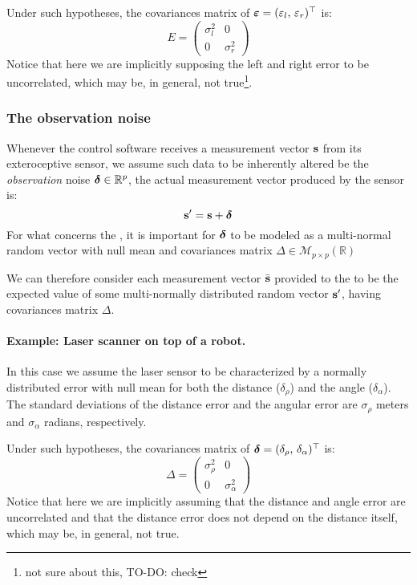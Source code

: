 			Under such hypotheses, the covariances matrix of $\boldsymbol{\mathrm{{\varepsilon}}} = (\varepsilon_l,\, \varepsilon_r)^\top$ is:
			\[
				E = 
				\left(\begin{array}{cc}
					\sigma^2_l & 0 \\
					0 & \sigma^2_r
				\end{array}\right)
			\]
			Notice that here we are implicitly supposing the left and right error to be uncorrelated, which may be, in general, not true\footnote{\label{sec.ekf.not_sure}not sure about this, TO-DO: check}.
			
	\subsubsection{The observation noise}
		Whenever the control software receives a measurement vector $\boldsymbol{\mathrm{{s}}}$ from its exteroceptive sensor, we assume such data to be inherently altered be the \emph{observation} noise $\boldsymbol{\mathrm{{\delta}}} \in \mathbb{R}^p$, \ie{} the actual measurement vector produced by the sensor is:
		\[
			\boldsymbol{\mathrm{{s}}}' = \boldsymbol{\mathrm{{s}}} + \boldsymbol{\mathrm{{\delta}}}
		\]
		For what concerns the \EKF{}, it is important for $\boldsymbol{\mathrm{{\delta}}}$ to be modeled as a multi-normal random vector with null mean and covariances matrix $\Delta \in \mathcal{M}_{p \times p}(\mathbb{R})$
		
		We can therefore consider each measurement vector $\bar{\boldsymbol{\mathrm{{s}}}}$ provided to the \EKF{} to be the expected value of some multi-normally distributed random vector $\boldsymbol{\mathrm{{s}}}'$, having covariances matrix $\Delta$.
		
		\paragraph{Example: Laser scanner on top of a robot.}
			In this case we assume the laser sensor to be characterized by a normally distributed error with null mean for both the distance ($\delta_\rho$) and the angle ($\delta_\alpha$). The standard deviations of the distance error and the angular error are $\sigma_\rho$ meters and $\sigma_\alpha$ radians, respectively.
			
			Under such hypotheses, the covariances matrix of $\boldsymbol{\mathrm{{\delta}}} = (\delta_\rho,\, \delta_\alpha)^\top$ is:
			\[
				\Delta =
				\left(\begin{array}{cc}
					\sigma^2_\rho & 0 \\
					0 & \sigma^2_\alpha
				\end{array}\right)
			\]
			Notice that here we are implicitly assuming that the distance and angle error are uncorrelated and that the distance error does not depend on the distance itself, which may be, in general, not true.
		
